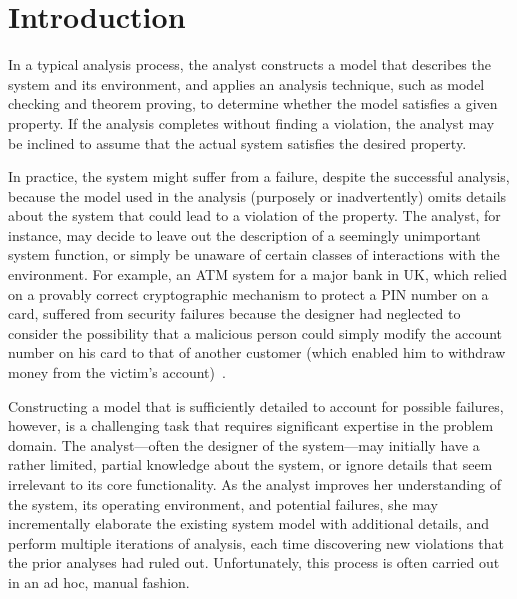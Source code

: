 
\section{Introduction}


In a typical analysis process, the analyst constructs a model that
describes the system and its environment, and applies an analysis
technique, such as model checking and theorem proving, to determine
whether the model satisfies a given property. If the analysis
completes without finding a violation, the analyst may be inclined to
assume that the actual system satisfies the desired property. 

In practice, the system might suffer from a failure, despite
the successful analysis, because the model used in the analysis
(purposely or inadvertently) omits details about the system that could
lead to a violation of the property. The analyst, for instance, may
decide to leave out the description of a seemingly unimportant system
function, or simply be unaware of certain classes of interactions with
the environment. For example, an ATM system for a major bank in UK,
which relied on a provably correct cryptographic mechanism to protect
a PIN number on a card, suffered from security failures because the
designer had neglected to consider the possibility that a malicious
person could simply modify the account number on his card to that
of another customer (which enabled him to withdraw money from the victim's
account)~\cite{anderson-needham}.

Constructing a model that is sufficiently detailed to account for
possible failures, however, is a challenging task that requires
significant expertise in the problem domain. The analyst---often the
designer of the system---may initially have a rather limited, partial
knowledge about the system, or ignore details that seem irrelevant
to its core functionality. As the analyst improves her understanding
of the system, its operating environment, and potential failures, she
may incrementally elaborate the existing system model with additional
details, and perform multiple iterations of analysis,
each time discovering new violations that the prior analyses had ruled
out. Unfortunately, this process is often carried out in an ad hoc,
manual fashion.

